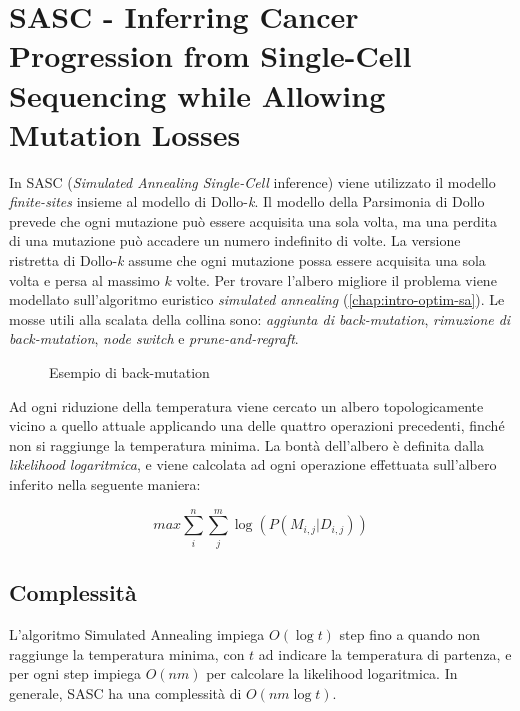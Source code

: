 \section{SASC - Inferring Cancer Progression from Single-Cell Sequencing while Allowing Mutation Losses \cite{SCiccolellaSasc}}
\label{chap:art-sasc}
In SASC (\textit{Simulated Annealing Single-Cell} inference) viene utilizzato il modello \textit{finite-sites} insieme al modello di Dollo-\textit{k}. Il modello della Parsimonia di Dollo prevede che ogni mutazione può essere acquisita una sola volta, ma una perdita di una mutazione può accadere un numero indefinito di volte. La versione ristretta di Dollo-\textit{k} assume che ogni mutazione possa essere acquisita una sola volta e persa al massimo $k$ volte. Per trovare l'albero migliore il problema viene modellato sull'algoritmo euristico \textit{simulated annealing} (\autoref{chap:intro-optim-sa}). Le mosse utili alla scalata della collina sono: \textit{aggiunta di back-mutation}, \textit{rimuzione di back-mutation}, \textit{node switch} e \textit{prune-and-regraft}.

\begin{figure}[h]
  \centering
  \caption{Esempio di back-mutation}
  \label{fig:art-sasc-bm}
\end{figure}

Ad ogni riduzione della temperatura viene cercato un albero topologicamente vicino a quello attuale applicando una delle quattro operazioni precedenti, finché non si raggiunge la temperatura minima. La bontà dell'albero è definita dalla \textit{likelihood logaritmica}, e viene calcolata ad ogni operazione effettuata sull'albero inferito nella seguente maniera:

\begin{equation}
  \label{eq:art-sasc-lh}
  max \sum_i^n \sum_j^m \log ( P( M_{i,j} | D_{i,j} ) )
\end{equation}

\subsection{Complessità}
L'algoritmo Simulated Annealing impiega $O(\log t)$ step fino a quando non raggiunge la temperatura minima, con $t$ ad indicare la temperatura di partenza, e per ogni step impiega $O(n m)$ per calcolare la likelihood logaritmica. In generale, SASC ha una complessità di $O(nm \log t)$.

  